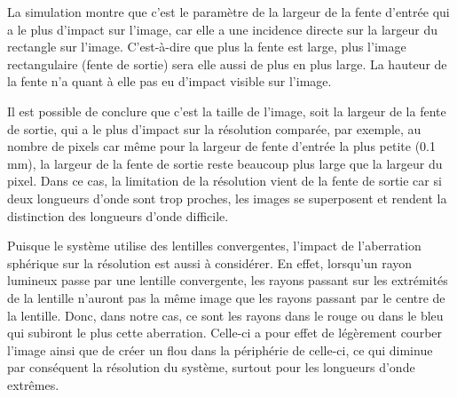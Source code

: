 \documentclass[conference]{IEEEtran}
\begin{document}
La simulation montre que c'est le paramètre de la largeur de la fente d'entrée qui a le plus d'impact sur l'image,
car elle a une incidence directe sur la largeur du rectangle sur l'image. C'est-à-dire que plus la fente est large, plus
l'image rectangulaire (fente de sortie) sera elle aussi de plus en plus large. La hauteur de la fente n'a quant à elle pas eu d'impact
visible sur l'image. 

Il est possible de conclure que c'est la taille de l'image, soit la largeur de la fente de sortie, qui a le plus d'impact sur la résolution comparée, par exemple, au nombre de pixels
car même pour la largeur de fente d'entrée la plus petite (0.1 mm), la largeur de la fente de sortie reste beaucoup plus large que la largeur du pixel.
Dans ce cas, la limitation de la résolution vient de la fente de sortie car si deux longueurs d'onde sont trop proches, les images se superposent
et rendent la distinction des longueurs d'onde difficile.



Puisque le système utilise des lentilles convergentes, l'impact de l'aberration sphérique \cite{edmund_optics_aberrations} sur la résolution est aussi à considérer.
En effet, lorsqu'un rayon lumineux passe par une lentille convergente, les rayons passant sur les extrémités de la lentille
n'auront pas la même image que les rayons passant par le centre de la lentille. Donc, dans notre cas, ce sont les
rayons dans le rouge ou dans le bleu qui subiront le plus cette aberration. Celle-ci a pour effet de légèrement courber l'image
ainsi que de créer un flou dans la périphérie de celle-ci, ce qui diminue par conséquent la résolution du système, surtout pour les longueurs d'onde
extrêmes. 
\end{document}
